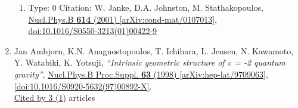 \documentclass[a4paper,10pt]{article}
\begin{document}
\begin{enumerate}
\begin{enumerate}
  \item Type: 0 Citation: W. Janke, D.A. Johnston, M. Stathakopoulos, \href{https://www.doi.org/10.1016/S0550-3213(01)00422-9}{Nucl.Phys.B {\bf 614} (2001) }  \href{https://arxiv.org/abs/cond-mat/0107013}{[arXiv:cond-mat/0107013]},\\\href{https://www.doi.org/10.1016/S0550-3213(01)00422-9}{doi:10.1016/S0550-3213(01)00422-9}
\end{enumerate}
\item Jan Ambjorn, K.N. Anagnostopoulos, T. Ichihara, L. Jensen, N. Kawamoto, Y. Watabiki, K. Yotsuji, {\it ``Intrinsic geometric structure of c = -2 quantum gravity''}, \href{https://www.doi.org/10.1016/S0920-5632(97)00892-X}{Nucl.Phys.B Proc.Suppl. {\bf 63} (1998) } \href{https://arxiv.org/abs/hep-lat/9709063}{[arXiv:hep-lat/9709063]}, \href{https://www.doi.org/10.1016/S0920-5632(97)00892-X}{[doi:10.1016/S0920-5632(97)00892-X]}.
\\\href{https://inspirehep.net/literature/?q=refersto%3Arecid%3A448560}{Cited by 3 (1)} articles


\end{enumerate}
\end{document}
